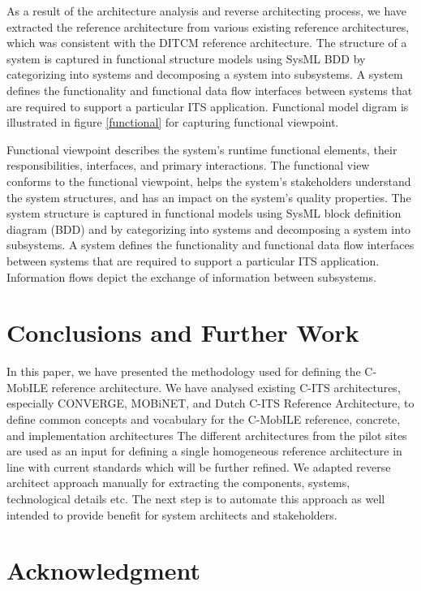 \documentclass[conference]{IEEEtran}
\begin{document}
As a result of the architecture analysis and reverse architecting process, we have extracted the reference architecture from various existing reference architectures, which was consistent with the DITCM reference architecture.
The structure of a system is captured in functional structure models using SysML BDD by categorizing into systems and decomposing a system into subsystems.
A system defines the functionality and functional data flow interfaces between systems that are required to support a particular ITS application.
Functional model digram is illustrated in figure \ref{functional} for capturing functional viewpoint.



Functional viewpoint describes the system’s runtime functional elements, their responsibilities, interfaces, and primary interactions.
The functional view conforms to the functional viewpoint, helps the system’s stakeholders understand the system structures, and has an impact on the system’s quality properties.
The system structure is captured in functional models using SysML block definition diagram (BDD) and by categorizing into systems and decomposing a system into subsystems.
A system defines the functionality and functional data flow interfaces between systems that are required to support a particular ITS application.
Information flows depict the exchange of information between subsystems.


\section{Conclusions and Further Work}

In this paper, we have presented the methodology used for defining the C-MobILE reference architecture.
We have analysed existing C-ITS architectures, especially CONVERGE, MOBiNET, and Dutch C-ITS Reference Architecture, to define common concepts and vocabulary for the C-MobILE reference, concrete, and implementation architectures The different architectures from the pilot sites are used as an input for defining a single homogeneous reference architecture in line with current standards which will be further refined.
We adapted reverse architect approach manually for extracting the components, systems, technological details etc.
The next step is to automate this approach as well intended to provide benefit for system architects and stakeholders.


\section*{Acknowledgment}
\end{document}
